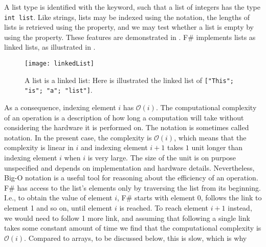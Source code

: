 A list type is identified with the  keyword, such that a list of integers has the type \lstinline!int list!. Like strings, lists may be indexed using the  notation, the lengths of lists is retrieved using the  property, and we may test whether a list is empty by using the  property. These features are demonstrated in .
%
%
F\# implements lists as linked lists, as illustrated in .
\begin{figure}
  \centering
  \texttt{[image: linkedList]}
  \caption{A list is a linked list: Here is illustrated the linked list of \mbox{\lstinline!["This"; "is"; "a"; "list"]!}.}
  \label{fig:linkedList}
\end{figure}
As a consequence, indexing element $i$ has  $\mathcal{O}(i)$. The computational complexity of an operation is a description of how long a computation will take without considering the hardware it is performed on. The notation is sometimes called  notation. In the present case, the complexity is $\mathcal{O}(i)$, which means that the complexity is linear in $i$ and indexing element $i+1$ takes $1$ unit longer than indexing element $i$ when $i$ is very large. The size of the unit is on purpose unspecified and depends on implementation and hardware details. Nevertheless, Big-O notation is a useful tool for reasoning about the efficiency of an operation. F\# has access to the list's elements only by traversing the list from its beginning. I.e., to obtain the value of element $i$, F\# starts with element 0, follows the link to element 1 and so on, until element $i$ is reached. To reach element $i+1$ instead, we would need to follow 1 more link, and assuming that following a single link takes some constant amount of time we find that the computational complexity is $\mathcal{O}(i)$.
Compared to arrays, to be discussed below, this is slow, which is why 


